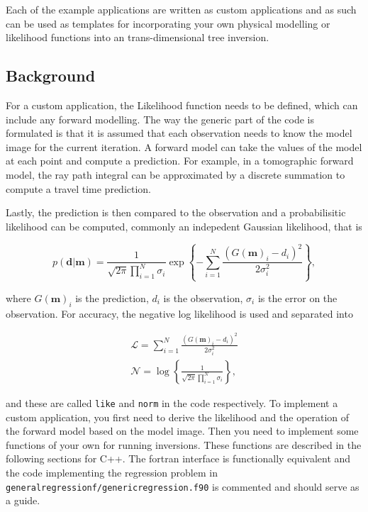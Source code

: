 \documentclass[a4paper,12pt]{article}
\begin{document}
Each of the example applications are written as custom applications and as such
can be used as templates for incorporating your own physical modelling or
likelihood functions into an trans-dimensional tree inversion.

\subsection{Background}

For a custom application, the Likelihood function needs to be defined,
which can include any forward modelling.  The way the generic part of
the code is formulated is that it is assumed that each observation
needs to know the model image for the current iteration. A forward
model can take the values of the model at each point and compute a
prediction. For example, in a tomographic forward model, the ray path
integral can be approximated by a discrete summation to compute a
travel time prediction.

Lastly, the prediction is then compared to the observation and a
probabilisitic likelihood can be computed, commonly an indepedent
Gaussian likelihood, that is

\begin{equation}
  p(\mathbf{d}|\mathbf{m}) = \frac{1}{\sqrt{2 \pi} \prod_{i=1}^N \sigma_i} \exp \left\{
  - \sum_{i = 1}^N \frac{(G(\mathbf{m})_i - d_i)^2}{2\sigma_i^2} \right\}
    ,
\end{equation}

where $G(\mathbf{m})_i$ is the prediction, $d_i$ is the observation,
$\sigma_i$ is the error on the observation. For accuracy, the negative
log likelihood is used and separated into

\begin{align}
  \label{eqn:like}
  \mathcal{L} = \sum_{i = 1}^N \frac{(G(\mathbf{m})_i - d_i)^2}{2\sigma_i^2} \\
  \label{eqn:norm}
  \mathcal{N} = \log \left\{ \frac{1}{\sqrt{2 \pi} \prod_{i=1}^N \sigma_i} \right\}
  ,
\end{align}

and these are called {\tt like} and {\tt norm} in the code
respectively. To implement a custom application, you first need to
derive the likelihood and the operation of the forward model based
on the model image. Then you need to implement some functions of
your own for running inversions. These functions are described in
the following sections for C++. The fortran interface is functionally
equivalent and the code implementing the regression problem in
{\tt generalregressionf/genericregression.f90} is commented and
should serve as a guide.
\end{document}
